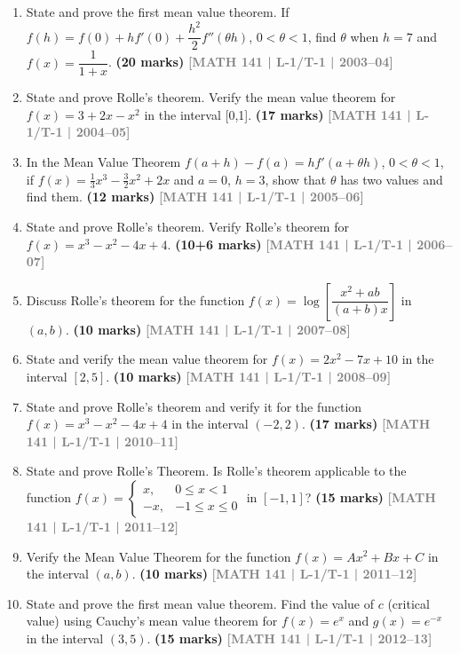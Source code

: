 \documentclass[12pt,a4paper]{article}
\newcommand{\yr}[1]{\hfill\textcolor{gray}{\small\textbf{[#1]}}}
\newcommand{\mk}[1]{\textcolor{orange!70!black}{\small\textbf{(#1 marks)}}}
\begin{document}
\begin{enumerate}

\item State and prove the first mean value theorem. If $f(h)=f(0)+hf'(0)+\dfrac{h^{2}}{2}f''(\theta h)$, $0<\theta<1$, find $\theta$ when $h=7$ and $f(x)=\dfrac{1}{1+x}$.
\mk{20} \yr{MATH 141 | L-1/T-1 | 2003--04}

\item State and prove Rolle's theorem. Verify the mean value theorem for $f(x)=3+2x-x^{2}$ in the interval [0,1].
\mk{17} \yr{MATH 141 | L-1/T-1 | 2004--05}

\item In the Mean Value Theorem $f(a+h)-f(a)=hf'(a+\theta h)$, $0<\theta<1$, if $f(x)=\tfrac{1}{3}x^{3}-\tfrac{3}{2}x^{2}+2x$ and $a=0$, $h=3$, show that $\theta$ has two values and find them.
\mk{12} \yr{MATH 141 | L-1/T-1 | 2005--06}

\item State and prove Rolle's theorem. Verify Rolle's theorem for $f(x)=x^{3}-x^{2}-4x+4$.
\mk{10+6} \yr{MATH 141 | L-1/T-1 | 2006--07}

\item Discuss Rolle's theorem for the function $f(x)=\log\!\left[\dfrac{x^{2}+ab}{(a+b)x}\right]$ in $(a,b)$.
\mk{10} \yr{MATH 141 | L-1/T-1 | 2007--08}

\item State and verify the mean value theorem for $f(x)=2x^{2}-7x+10$ in the interval $[2,5]$.
\mk{10} \yr{MATH 141 | L-1/T-1 | 2008--09}

\item State and prove Rolle's theorem and verify it for the function $f(x)=x^{3}-x^{2}-4x+4$ in the interval $(-2,2)$.
\mk{17} \yr{MATH 141 | L-1/T-1 | 2010--11}

\item State and prove Rolle's Theorem. Is Rolle's theorem applicable to the function
$f(x)=\begin{cases}x, & 0\le x<1\\ -x, & -1\leq x \leq0\end{cases}$
in $[-1,1]$?
\mk{15} \yr{MATH 141 | L-1/T-1 | 2011--12}

\item Verify the Mean Value Theorem for the function $f(x)=Ax^{2}+Bx+C$ in the interval $(a,b)$.
\mk{10} \yr{MATH 141 | L-1/T-1 | 2011--12}

\item State and prove the first mean value theorem. Find the value of $c$ (critical value) using Cauchy's mean value theorem for $f(x)=e^{x}$ and $g(x)=e^{-x}$ in the interval $(3,5)$.
\mk{15} \yr{MATH 141 | L-1/T-1 | 2012--13}


\end{enumerate}
\end{document}
